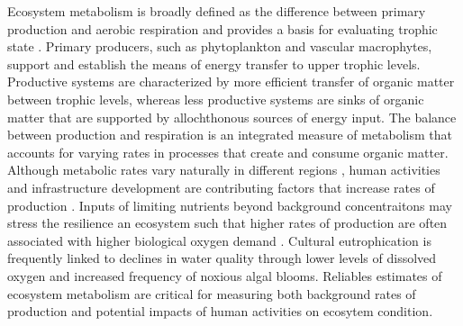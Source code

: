 \begin{comment}
  Can we describe the magnitude of the noise or bias in estimates of ecosystem 
    metabolism?
  
  Is this noise or an actual source of bias?
  
  Can stations be categorized as to the expected types of noise or bias?
  
  If so, can this noise or bias be removed?
    
    For example, what is minimum averaging window or minimum sampling time     
      required to remove noise or bias (e.g., can we reduce the noise to +/- 
      10\% of expected)?  
    
    Can empirical correction models be developed on a site-level basis that 
      accounts for noise or bias?
  
  The approach is meant to characterize existing noise/bias but also outline 
    strategies for obtaining estimates of wq trends with more accuracy -- What 
    kinds of strategies give us high quality information? 
\end{comment}

Ecosystem metabolism is broadly defined as the difference between primary production and aerobic respiration and provides a basis for evaluating trophic state \citep{Kemp12,Needoba12}.  Primary producers, such as phytoplankton and vascular macrophytes, support and establish the means of energy transfer to upper trophic levels. Productive systems are characterized by more efficient transfer of organic matter between trophic levels, whereas less productive systems are sinks of organic matter that are supported by allochthonous sources of energy input.  The balance between production and respiration is an integrated measure of metabolism that accounts for varying rates in processes that create and consume organic matter.  Although metabolic rates vary naturally in different regions \citep{Caffrey04}, human activities and infrastructure development are contributing factors that increase rates of production \citep{Diaz08}.  Inputs of limiting nutrients beyond background concentraitons may stress the resilience an ecosystem such that higher rates of production are often associated with higher biological oxygen demand \citep{Yin04,Kemp09}.  Cultural eutrophication is frequently linked to declines in water quality through lower levels of dissolved oxygen and increased frequency of noxious algal blooms.  Reliables estimates of ecosystem metabolism are critical for measuring both background rates of production and potential impacts of human activities on ecosytem condition.     

